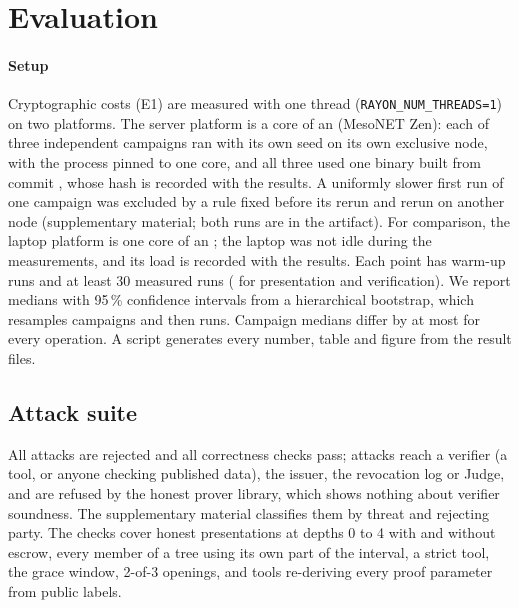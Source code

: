 \section{Evaluation}\label{sec:eval}
\paragraph*{Setup} Cryptographic costs (E1) are measured with one thread (\texttt{RAYON\_NUM\_THREADS=1}) on two platforms. The server platform is a core of an \CpuZen{} (MesoNET Zen): each of three independent campaigns ran with its own seed on its own exclusive node, with the process pinned to one core, and all three used one binary built from commit \texttt{\GitCommit}, whose hash is recorded with the results. A uniformly slower first run of one campaign was excluded by a rule fixed before its rerun and rerun on another node (supplementary material; both runs are in the artifact). For comparison, the laptop platform is one core of an \CpuMac{}; the laptop was not idle during the measurements, and its load is recorded with the results. Each point has \Warmup{} warm-up runs and at least 30 measured runs (\BenchN{} for presentation and verification). We report medians with 95\,\% confidence intervals from a hierarchical bootstrap, which resamples campaigns and then runs. Campaign medians differ by at most \CampSpread{} for every operation. A script generates every number, table and figure from the result files.

\subsection{Attack suite}
All \NAttacks{} attacks are rejected and all \NChecks{} correctness checks pass; \NAttReach{} attacks reach a verifier (a tool, or anyone checking published data), the issuer, the revocation log or Judge, and \NAttProver{} are refused by the honest prover library, which shows nothing about verifier soundness. The supplementary material classifies them by threat and rejecting party. The checks cover honest presentations at depths 0 to 4 with and without escrow, every member of a tree using its own part of the interval, a strict tool, the grace window, 2-of-3 openings, and tools re-deriving every proof parameter from public labels.

